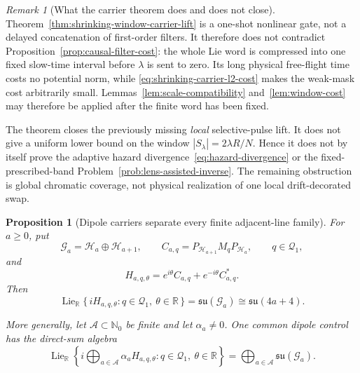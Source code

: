 \documentclass[11pt]{article}
\newtheorem{proposition}[theorem]{Proposition}
\theoremstyle{remark}
\newtheorem{remark}[theorem]{Remark}
\begin{document}
\begin{remark}[What the carrier theorem does and does not close]
\label{rem:carrier-local-not-global}
Theorem~\ref{thm:shrinking-window-carrier-lift} is a one-shot nonlinear
gate, not a delayed concatenation of first-order filters.  It therefore does
not contradict Proposition~\ref{prop:causal-filter-cost}: the whole Lie word
is compressed into one fixed slow-time interval before $\lambda$ is sent to
zero.  Its long physical free-flight time costs no potential norm, while
\eqref{eq:shrinking-carrier-l2-cost} makes the weak-mask cost arbitrarily
small.  Lemmas~\ref{lem:scale-compatibility} and~\ref{lem:window-cost} may
therefore be applied after the finite word has been fixed.

The theorem closes the previously missing \emph{local} selective-pulse lift.
It does not give a uniform lower bound on the window
$|S_\lambda|=2\lambda R/N$.  Hence it does not by itself prove the adaptive
hazard divergence~\eqref{eq:hazard-divergence} or the fixed-prescribed-band
Problem~\ref{prob:lens-assisted-inverse}.  The remaining obstruction is
global chromatic coverage, not physical realization of one local
drift-decorated swap.
\end{remark}

\begin{proposition}[Dipole carriers separate every finite adjacent-line family]
\label{prop:dipole-direct-sum-carrier-algebra}
For $a\geq0$, put
\[
 \mathcal G_a=\mathcal H_a\oplus\mathcal H_{a+1},
 \qquad
 C_{a,q}=P_{\mathcal H_{a+1}}M_qP_{\mathcal H_a},
 \qquad q\in\mathcal Q_1,
\]
and
\[
 H_{a,q,\theta}
 =e^{i\theta}C_{a,q}+e^{-i\theta}C_{a,q}^\ast.
\]
Then
\begin{equation}
 \operatorname{Lie}_{\mathbb R}
 \{\,iH_{a,q,\theta}:q\in\mathcal Q_1,\ \theta\in\mathbb R\,\}
 =
 \mathfrak{su}(\mathcal G_a)
 \cong\mathfrak{su}(4a+4).
 \label{eq:dipole-pair-full-su}
\end{equation}

More generally, let $\mathcal A\subset\mathbb N_0$ be finite and let
$\alpha_a\neq0$.  One common dipole control has the direct-sum algebra
\begin{equation}
 \operatorname{Lie}_{\mathbb R}
 \left\{
  i\bigoplus_{a\in\mathcal A}
  \alpha_aH_{a,q,\theta}:
  q\in\mathcal Q_1,\ \theta\in\mathbb R
 \right\}
 =
 \bigoplus_{a\in\mathcal A}\mathfrak{su}(\mathcal G_a).
 \label{eq:dipole-finite-line-separation}
\end{equation}
\end{proposition}
\end{document}

